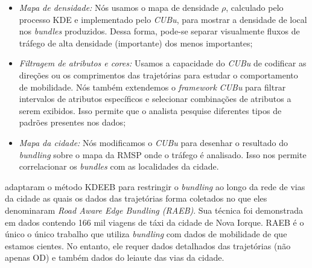 \begin{itemize}
\item\emph{Mapa de densidade:} Nós usamos o mapa de densidade $\rho$,
calculado pelo processo KDE e implementado pelo \emph{CUBu}, para mostrar a densidade de
local nos \emph{bundles} produzidos. Dessa forma, pode-se separar visualmente
fluxos de tráfego de alta densidade (importante) dos menos importantes;
 
\item\emph{Filtragem de atributos e cores:} Usamos a capacidade do \emph{CUBu} de
codificar as direções ou os comprimentos das trajetórias para
estudar o comportamento de mobilidade. Nós também extendemos o \emph{framework} \emph{CUBu}
para filtrar intervalos de atributos específicos e selecionar combinações de atributos a
serem exibidos. Isso permite que o analista pesquise diferentes tipos de padrões
presentes nos dados;

\item\emph{Mapa da cidade:} Nós modificamos o \emph{CUBu} para desenhar
o resultado do \emph{bundling} sobre o mapa da RMSP onde o tráfego é analisado. Isso nos permite
correlacionar os \emph{bundles} com as localidades da cidade.
\end{itemize}


\cite{zeng:19} adaptaram o método KDEEB para restringir o \emph{bundling}
ao longo da rede de vias da cidade as quais os dados das trajetórias forma
coletados no que eles denominaram \emph{Road Aware Edge
Bundling (RAEB)}. Sua técnica foi demonstrada em dados contendo
166 mil viagens de táxi da cidade de Nova Iorque. RAEB é o único o único
trabalho que utiliza \emph{bundling} com dados de mobilidade de que estamos cientes.
No entanto, ele requer dados detalhados das trajetórias (não apenas OD) e também
dados do leiaute das vias da cidade.


